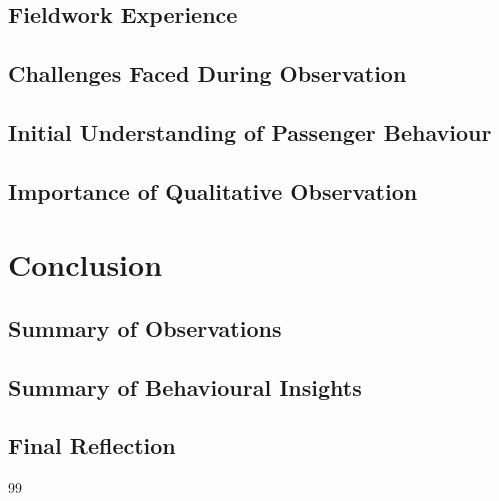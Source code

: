 \documentclass[12pt,a4paper]{report}
\begin{document}
\section{Fieldwork Experience}

\section{Challenges Faced During Observation}

\section{Initial Understanding of Passenger Behaviour}

\section{Importance of Qualitative Observation}


\chapter{Conclusion}

\section{Summary of Observations}

\section{Summary of Behavioural Insights}

\section{Final Reflection}


\begin{thebibliography}{99}

\end{thebibliography}

\end{document}
